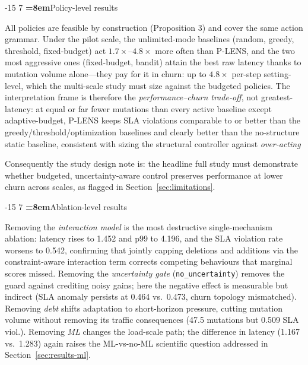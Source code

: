 \documentclass[runningheads]{llncs}
\makeatletter
\renewcommand\subsection{\@startsection{subsection}{2}{\z@}%
  {-15\p@ \@plus -4\p@ \@minus -4\p@}%
  {7\p@ \@plus 4\p@ \@minus 4\p@}%
  {\normalfont\normalsize\bfseries\boldmath\color{vitblue}%
   \rightskip=\z@ \@plus 8em\pretolerance=10000}}
\makeatother
\begin{document}
\subsection{Policy-level results}
\label{sec:res-policies}

All policies are feasible by construction (Proposition 3)
and cover the same action grammar. Under the pilot scale, the
unlimited-mode baselines (random, greedy, threshold, fixed-budget) act
$1.7\times$--$4.8\times$ more often than P-LENS, and the two most aggressive
ones (fixed-budget, bandit) attain the best raw latency thanks to mutation
volume alone—they pay for it in churn: up to $4.8\times$ per-step setting-level,
which the multi-scale study must size against the budgeted policies.
The interpretation frame is therefore the \emph{performance--churn
trade-off}, not greatest-latency: at equal or far fewer mutations than
every active baseline except adaptive-budget, P-LENS keeps SLA violations
comparable to or better than the greedy/threshold/optimization baselines
and clearly better than the no-structure static baseline, consistent with
sizing the structural controller against \emph{over-acting}

Consequently the study design note is: the headline full study must
demonstrate whether budgeted, uncertainty-aware control preserves
performance at lower churn across scales, as flagged in
Section~\ref{sec:limitations}.

\subsection{Ablation-level results}
\label{sec:res-ablations}

Removing the \emph{interaction model} is the most destructive
single-mechanism ablation: latency rises to 1.452 and p99 to 4.196, and the
SLA violation rate worsens to 0.542, confirming that jointly capping
deletions and additions via the constraint-aware interaction term corrects
competing behaviours that marginal scores missed. Removing the
\emph{uncertainty gate} (\texttt{no\_uncertainty}) removes the guard
against crediting noisy gains; here the negative effect is measurable but
indirect (SLA anomaly persists at 0.464 vs.\ 0.473, churn topology
mismatched). Removing \emph{debt} shifts adaptation to short-horizon
pressure, cutting mutation volume without removing its traffic consequences
(47.5 mutations but 0.509 SLA viol.). Removing \emph{ML} changes the
load-scale path; the difference in latency (1.167 vs.\ 1.283) again raises
the ML-vs-no-ML scientific question addressed in
Section~\ref{sec:results-ml}.
\end{document}
